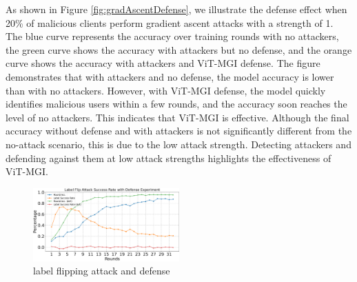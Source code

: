 \documentclass[conference]{IEEEtran}
\def\figLabelFlipDefense{0.5\textwidth}
\begin{document}
As shown in Figure \hyperref[fig:gradAscentDefense]{\ref{fig:gradAscentDefense}}, we illustrate the defense effect when 20\% of malicious clients perform gradient ascent attacks with a strength of 1. The blue curve represents the accuracy over training rounds with no attackers, the green curve shows the accuracy with attackers but no defense, and the orange curve shows the accuracy with attackers and ViT-MGI defense. The figure demonstrates that with attackers and no defense, the model accuracy is lower than with no attackers. However, with ViT-MGI defense, the model quickly identifies malicious users within a few rounds, and the accuracy soon reaches the level of no attackers. This indicates that ViT-MGI is effective. Although the final accuracy without defense and with attackers is not significantly different from the no-attack scenario, this is due to the low attack strength. Detecting attackers and defending against them at low attack strengths highlights the effectiveness of ViT-MGI.

\begin{figure}[htbp]
    \centerline{\includegraphics[width=\figLabelFlipDefense]{pics/005-LabelFlippingAttack-withDefense.pdf}}
    \caption{label flipping attack and defense}
    \label{fig:labelFlipDefense}
\end{figure}

\end{document}
